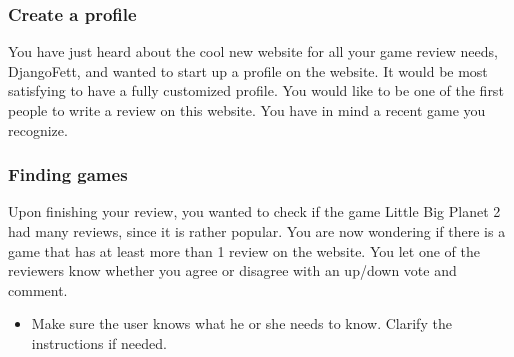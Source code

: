 \documentclass[11pt]{extarticle}
\begin{document}
   \subsubsection*{Create a profile}
      You have just heard about the cool new website for all your game review needs, DjangoFett, and wanted
      to start up a profile on the website. It would be most satisfying to have a fully customized profile.
      You would like to be one of the first people to write a review on this
      website. You have in mind a recent game you recognize.
   \subsubsection*{Finding games}
      Upon finishing your review, you wanted to check if the game Little Big Planet 2 had many reviews, since it is
      rather popular. You are now wondering if there is a game that has at least more than 1 review
      on the website. You let one of the reviewers know whether you agree or disagree with an up/down vote
      and comment.
\begin{itemize}
\item Make sure the user knows what he or she needs to know. Clarify the instructions if needed.
\end{itemize}
\end{document}
